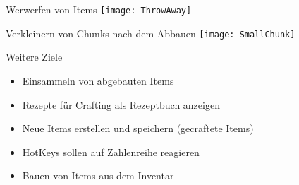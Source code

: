 \documentclass{beamer}				%
\begin{document}
	\begin{frame}{Werwerfen von Items}
	\centering
	\texttt{[image: ThrowAway]}
	\end{frame}
	
	\begin{frame}{Verkleinern von Chunks nach dem Abbauen}
	\centering
	\texttt{[image: SmallChunk]}
	\end{frame}
	
	\begin{frame}{Weitere Ziele}
		\begin{itemize}
			\item Einsammeln von abgebauten Items
			\item Rezepte für Crafting als Rezeptbuch anzeigen
			\item Neue Items erstellen und speichern (gecraftete Items)
			\item HotKeys sollen auf Zahlenreihe reagieren 
			\item Bauen von Items aus dem Inventar
		\end{itemize}
	\end{frame}
\end{document}
